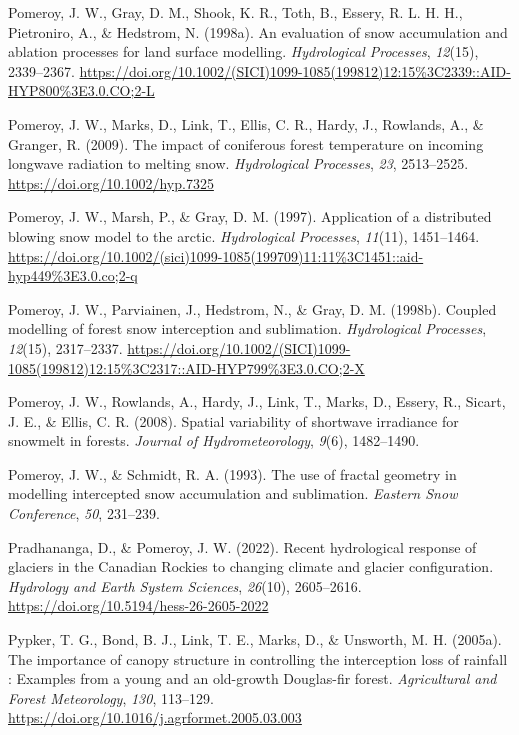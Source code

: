\documentclass[
  letterpaper,
]{tex/uofsthesis-cs}
\newlength{\cslhangindent}
\newenvironment{CSLReferences}[2] %
 {\begin{list}{}{%
  \setlength{\itemindent}{0pt}
  \setlength{\leftmargin}{0pt}
  \setlength{\parsep}{0pt}
  \ifodd #1
   \setlength{\leftmargin}{\cslhangindent}
   \setlength{\itemindent}{-1\cslhangindent}
  \fi
  \setlength{\itemsep}{#2\baselineskip}}}
 {\end{list}}
\begin{document}
\begin{CSLReferences}{1}{0}
Pomeroy, J. W., Gray, D. M., Shook, K. R., Toth, B., Essery, R. L. H.
H., Pietroniro, A., \& Hedstrom, N. (1998a). An evaluation of snow
accumulation and ablation processes for land surface modelling.
\emph{Hydrological Processes}, \emph{12}(15), 2339--2367.
\url{https://doi.org/10.1002/(SICI)1099-1085(199812)12:15\%3C2339::AID-HYP800\%3E3.0.CO;2-L}

Pomeroy, J. W., Marks, D., Link, T., Ellis, C. R., Hardy, J., Rowlands,
A., \& Granger, R. (2009). The impact of coniferous forest temperature
on incoming longwave radiation to melting snow. \emph{Hydrological
Processes}, \emph{23}, 2513--2525.
\url{https://doi.org/10.1002/hyp.7325}

Pomeroy, J. W., Marsh, P., \& Gray, D. M. (1997). Application of a
distributed blowing snow model to the arctic. \emph{Hydrological
Processes}, \emph{11}(11), 1451--1464.
\url{https://doi.org/10.1002/(sici)1099-1085(199709)11:11\%3C1451::aid-hyp449\%3E3.0.co;2-q}

Pomeroy, J. W., Parviainen, J., Hedstrom, N., \& Gray, D. M. (1998b).
Coupled modelling of forest snow interception and sublimation.
\emph{Hydrological Processes}, \emph{12}(15), 2317--2337.
\url{https://doi.org/10.1002/(SICI)1099-1085(199812)12:15\%3C2317::AID-HYP799\%3E3.0.CO;2-X}

Pomeroy, J. W., Rowlands, A., Hardy, J., Link, T., Marks, D., Essery,
R., Sicart, J. E., \& Ellis, C. R. (2008). Spatial variability of
shortwave irradiance for snowmelt in forests. \emph{Journal of
Hydrometeorology}, \emph{9}(6), 1482--1490.

Pomeroy, J. W., \& Schmidt, R. A. (1993). The use of fractal geometry in
modelling intercepted snow accumulation and sublimation. \emph{Eastern
Snow Conference}, \emph{50}, 231--239.

Pradhananga, D., \& Pomeroy, J. W. (2022). Recent hydrological response
of glaciers in the {Canadian Rockies} to changing climate and glacier
configuration. \emph{Hydrology and Earth System Sciences},
\emph{26}(10), 2605--2616.
\url{https://doi.org/10.5194/hess-26-2605-2022}

Pypker, T. G., Bond, B. J., Link, T. E., Marks, D., \& Unsworth, M. H.
(2005a). The importance of canopy structure in controlling the
interception loss of rainfall : {Examples} from a young and an
old-growth {Douglas-fir} forest. \emph{Agricultural and Forest
Meteorology}, \emph{130}, 113--129.
\url{https://doi.org/10.1016/j.agrformet.2005.03.003}


\end{CSLReferences}
\end{document}
